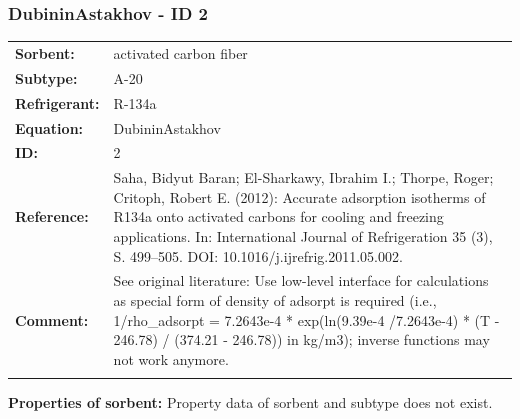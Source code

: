 \subsubsection{DubininAstakhov - ID 2}
%
\begin{tabular}[l]{|lp{11.5cm}|}
\hline
\addlinespace

\textbf{Sorbent:} & activated carbon fiber \\
\textbf{Subtype:} & A-20 \\
\textbf{Refrigerant:} & R-134a \\
\textbf{Equation:} & DubininAstakhov \\
\textbf{ID:} & 2 \\
\textbf{Reference:} & Saha, Bidyut Baran; El-Sharkawy, Ibrahim I.; Thorpe, Roger; Critoph, Robert E. (2012): Accurate adsorption isotherms of R134a onto activated carbons for cooling and freezing applications. In: International Journal of Refrigeration 35 (3), S. 499–505. DOI: 10.1016/j.ijrefrig.2011.05.002. \\
\textbf{Comment:} & See original literature: Use low-level interface for calculations as special form of density of adsorpt is required (i.e., 1/rho\_adsorpt = 7.2643e-4 * exp(ln(9.39e-4 /7.2643e-4) * (T - 246.78) / (374.21 - 246.78)) in kg/m3); inverse functions may not work anymore. \\

\addlinespace
\hline
\end{tabular}
\newline

\textbf{Properties of sorbent:}
\newline
%
Property data of sorbent and subtype does not exist.

